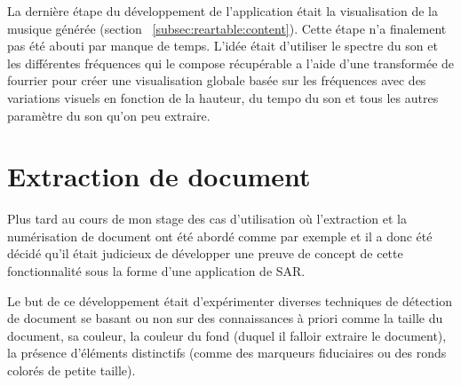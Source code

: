 La dernière étape du développement de l'application était la visualisation de la musique générée (section ~\ref{subsec:reartable:content}). Cette étape n'a finalement pas été abouti par manque de temps. L'idée était d'utiliser le spectre du son et les différentes fréquences qui le compose récupérable a l'aide d'une transformée de fourrier pour créer une visualisation globale basée sur les fréquences avec des variations visuels en fonction de la hauteur, du tempo du son et tous les autres paramètre du son qu'on peu extraire.



\section{Extraction de document}
\label{sec:document}
Plus tard au cours de mon stage des cas d'utilisation où l'extraction et la numérisation de document ont été abordé comme par exemple %
et il a donc été décidé qu'il était judicieux de développer une preuve de concept de cette fonctionnalité sous la forme d'une application de SAR.

Le but de ce développement était d'expérimenter diverses techniques de détection de document se basant ou non sur des connaissances à priori comme la taille du document, sa couleur, la couleur du fond (duquel il falloir extraire le document), la présence d’éléments distinctifs (comme des marqueurs fiduciaires ou des ronds colorés de petite taille).

